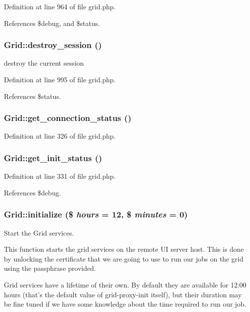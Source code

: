 Definition at line 964 of file grid.php.

References \$debug, and \$status.
\subsubsection{\setlength{\rightskip}{0pt plus 5cm}Grid::destroy\_\-session ()}\label{classGrid_a21}


destroy the current session 



Definition at line 995 of file grid.php.

References \$status.
\subsubsection{\setlength{\rightskip}{0pt plus 5cm}Grid::get\_\-connection\_\-status ()}\label{classGrid_a7}




Definition at line 326 of file grid.php.
\subsubsection{\setlength{\rightskip}{0pt plus 5cm}Grid::get\_\-init\_\-status ()}\label{classGrid_a8}




Definition at line 331 of file grid.php.

References \$debug.
\subsubsection{\setlength{\rightskip}{0pt plus 5cm}Grid::initialize (\$ {\em hours} = 12, \$ {\em minutes} = 0)}\label{classGrid_a18}


Start the Grid services. 

This function starts the grid services on the remote UI server host. This is done by unlocking the certificate that we are going to use to run our jobs on the grid using the passphrase provided.

Grid services have a lifetime of their own. By default they are available for 12:00 hours (that's the default value of grid-proxy-init itself), but their duration may be fine tuned if we have some knowledge about the time required to run our job.

